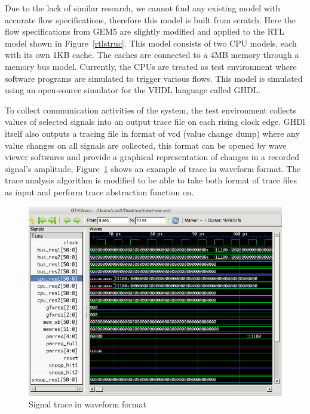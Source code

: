 \documentclass[12pt,frontmatter,copyright,thesis]{usfmanus}
\begin{document}
 Due to the lack of similar research, we cannot find any existing model with accurate flow specifications,
therefore this model is built from scratch.
Here the flow specifications from GEM5 are slightly modified and applied
to the RTL model shown in Figure~\ref{rtlstruc}.
 This model consists of two CPU models, each with its own 1KB cache.
 The caches are connected to a 4MB memory through a memory bus model.
 Currently, the CPUs are treated as test environment where software programs are simulated to trigger various flows.
 This model is simulated using an open-source simulator for the VHDL language called GHDL.


 To collect communication activities of the system,
 the test environment collects values of selected signals
 into an output trace file on each rising clock edge.
GHDl itself also
outputs a tracing file in format of vcd (value change dump) where
any value changes on all signals are collected, this format
can be opened by wave viewer softwares and provide a 
graphical representation of changes in a recorded signal's amplitude,
Figure~\ref{wave} shows an example of trace in waveform format.
The trace analysis algorithm is modified to be able
to take both format of trace files as input and
perform trace abstraction function on.
 \begin{figure} [h]
\centerline{
\includegraphics[width=5in]{wave.png}}
\caption{Signal trace in waveform format}
\label{wave}
\end{figure}
\end{document}
